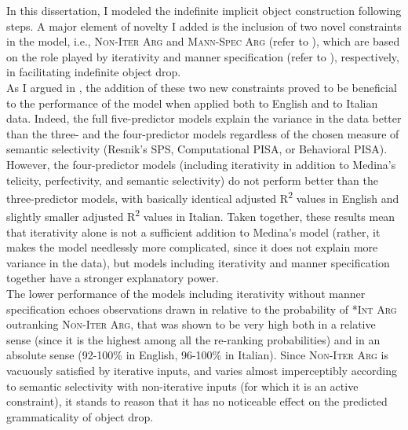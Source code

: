 In this dissertation, I modeled the indefinite implicit object construction following  steps. A major element of novelty I added is the inclusion of two novel constraints in the model, i.e., \textsc{Non-Iter Arg} and \textsc{Mann-Spec Arg} (refer to ), which are based on the role played by iterativity and manner specification (refer to ), respectively, in facilitating indefinite object drop.\\
As I argued in , the addition of these two new constraints proved to be beneficial to the performance of the model when applied both to English and to Italian data. Indeed, the full five-predictor models explain the variance in the data better than the three- and the four-predictor models regardless of the chosen measure of semantic selectivity (Resnik's SPS, Computational PISA, or Behavioral PISA). However, the four-predictor models (including iterativity in addition to Medina's telicity, perfectivity, and semantic selectivity) do not perform better than the three-predictor models, with basically identical adjusted R\textsuperscript{2} values in English and slightly smaller adjusted R\textsuperscript{2} values in Italian. Taken together, these results mean that iterativity alone is not a sufficient addition to Medina's model (rather, it makes the model needlessly more complicated, since it does not explain more variance in the data), but models including iterativity and manner specification together have a stronger explanatory power.\\
The lower performance of the models including iterativity without manner specification echoes observations drawn in  relative to the probability of \textsc{*Int Arg} outranking \textsc{Non-Iter Arg}, that was shown to be very high both in a relative sense (since it is the highest among all the re-ranking probabilities) and in an absolute sense (92-100\% in English, 96-100\% in Italian). Since \textsc{Non-Iter Arg} is vacuously satisfied by iterative inputs, and varies almost imperceptibly according to semantic selectivity with non-iterative inputs (for which it is an active constraint), it stands to reason that it has no noticeable effect on the predicted grammaticality of object drop.\\
